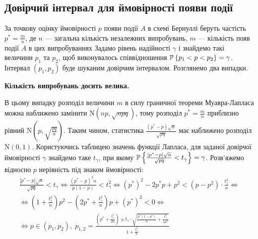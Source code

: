 \subsection{Довірчий інтервал для ймовірності появи події}
За точкову оцінку ймовірності $p$ появи події $A$
в схемі Бернуллі беруть частість $p^* = \frac{m}{n}$, де $n$ ---
загальна кількість незалежних випробувань,
$m$ --- кількість появ події $A$ в цих випробуваннях
Задамо рівень надійності $\gamma$
і знайдемо такі величини $p_1$ та $p_2$, щоб
виконувалось співвідношення $\P\left\{ p_1 < p < p_2\right\} = \gamma$.
Інтервал $(p_1, p_2)$ буде шуканим довірчим інтервалом. Розглянемо два випадки.

\noindent\textbf{Кількість випробувань досить велика.} 

В цьому випадку розподіл величини $m$ в силу граничної теореми Муавра-Лапласа 
можна наближено замінити $\mathrm{N}(np, \sqrt{npq})$, тому
розподіл $p^* = \frac{m}{n}$ приблизно рівний $\mathrm{N}\left(p, \sqrt{\frac{pq}{n}} \right)$.
Таким чином, статистика $\frac{(p^* - p)\sqrt{n}}{\sqrt{pq}}$ має наближено розподіл $\mathrm{N}(0, 1)$.
Користуючись таблицею значень функції Лапласа, для заданої довірчої ймовірності $\gamma$ знайдемо таке $t_{\gamma}$,
при якому 
$\P\left\{\frac{|p^* - p|\sqrt{n}}{\sqrt{pq}} < t_{\gamma}\right\} = \gamma$. Розв'яжемо відносно $p$ нерівність під знаком ймовірності:
\begin{gather*}
    \frac{|p^* - p|\sqrt{n}}{\sqrt{pq}} < t_{\gamma} \Leftrightarrow
    \frac{(p^* - p)^2 n}{p(1-p)} < t^2_{\gamma} \Leftrightarrow
    (p^*)^2 - 2p^* p + p^2 < \left(p - p^2\right)\cdot \frac{t^2_{\gamma}}{n} \Leftrightarrow \\
    \Leftrightarrow
    \left(1 + \frac{t^2_{\gamma}}{n}\right)p^2 - \left(2p^* + \frac{t^2_{\gamma}}{n}\right)p + (p^*)^2 < 0 \Leftrightarrow \\
    \Leftrightarrow
    p \in (p_1, p_2), \; p_{1, 2} = \frac{\left(p^* + \frac{t^2_{\gamma}}{2n}\right) \pm t_{\gamma} \cdot \sqrt{\frac{p^*(1-p^*)}{n} + \frac{t^2_{\gamma}}{4n^2}}}{1 + \frac{t^2_{\gamma}}{n}}
\end{gather*}

